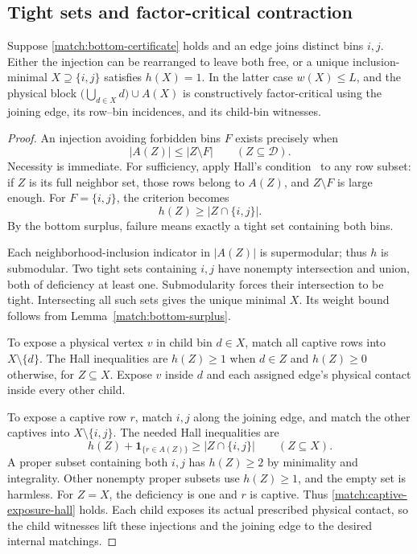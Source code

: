 \subsection{Tight sets and factor-critical contraction}

\begin{lemma}
\label{match:tight-contraction}
Suppose \eqref{match:bottom-certificate} holds and an edge joins
distinct bins \(i,j\).  Either the injection can be rearranged to
leave both free, or a unique inclusion-minimal
\(X\supseteq\{i,j\}\) satisfies \(h(X)=1\).
In the latter case \(w(X)\le L\), and the physical block
\(\bigl(\bigcup_{d\in X}d\bigr)\cup A(X)\) is constructively factor-critical using the joining
edge, its row--bin incidences, and its child-bin witnesses.
\end{lemma}
\begin{proof}
An injection avoiding forbidden bins \(F\) exists precisely when
\[
                        |A(Z)|\le |Z\setminus F|
                   \qquad(Z\subseteq\mathcal D).
\]
Necessity is immediate.  For sufficiency, apply Hall's condition~\cite[Theorem~1]{Hall1935}
to any row subset: if \(Z\) is its full neighbor set, those rows
belong to \(A(Z)\), and \(Z\setminus F\) is large enough.
For \(F=\{i,j\}\), the criterion becomes
\begin{equation}
                          h(Z)\ge |Z\cap\{i,j\}|.
 \label{match:joint-hall}
\end{equation}
By the bottom surplus, failure means exactly a tight set containing
both bins.

Each neighborhood-inclusion indicator in \(|A(Z)|\) is
supermodular; thus \(h\) is submodular.  Two tight sets containing
\(i,j\) have nonempty intersection and union, both of deficiency
at least one.  Submodularity forces their intersection to be tight.
Intersecting all such sets gives the unique minimal \(X\).
Its weight bound follows from Lemma~\ref{match:bottom-surplus}.

To expose a physical vertex \(v\) in child bin \(d\in X\),
match all captive rows into \(X\setminus\{d\}\).
The Hall inequalities are \(h(Z)\ge1\) when \(d\in Z\)
and \(h(Z)\ge0\) otherwise, for \(Z\subseteq X\).
Expose \(v\) inside \(d\) and each assigned edge's physical contact
inside every other child.

To expose a captive row \(r\), match \(i,j\) along the joining edge,
and match the other captives into \(X\setminus\{i,j\}\).
The needed Hall inequalities are
\begin{equation}
 h(Z)+\boldsymbol1_{\{r\in A(Z)\}}\ge |Z\cap\{i,j\}|
                         \qquad(Z\subseteq X).
 \label{match:captive-exposure-hall}
\end{equation}
A proper subset containing both \(i,j\) has \(h(Z)\ge2\) by
minimality and integrality.  Other nonempty proper subsets use
\(h(Z)\ge1\), and the empty set is harmless.  For \(Z=X\),
the deficiency is one and \(r\) is captive.  Thus
\eqref{match:captive-exposure-hall} holds.  Each child exposes its
actual prescribed physical contact, so the child witnesses lift
these injections and the joining edge to the desired internal
matchings.
\end{proof}

